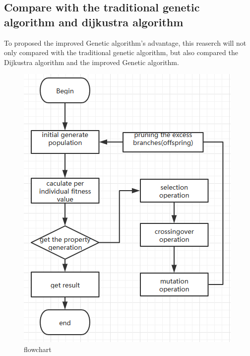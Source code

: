 \documentclass[12pt]{article}
\begin{document}
\subsection{Compare with the traditional genetic algorithm and dijkustra algorithm }
To proposed the improved Genetic algorithm's advantage, this reaserch will not only compared with the traditional genetic algorithm, but also compared the Dijkustra algorithm and the improved Genetic algorithm.




\begin{figure}[h]
	\centering
	\includegraphics{flowchart1}
	\caption{flowchart}
\end{figure}
	\small
	
	

%
%
\end{document}
